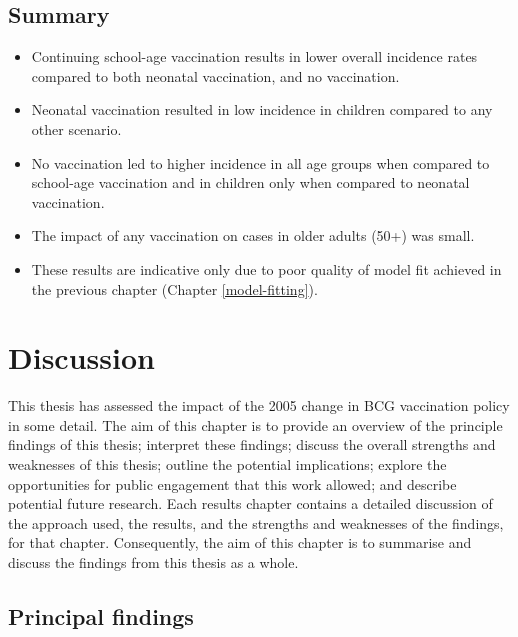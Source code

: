 \documentclass[11pt,twoside]{bristolthesis}
\providecommand{\tightlist}{%
  \setlength{\itemsep}{0pt}\setlength{\parskip}{0pt}}
\begin{document}
  \hypertarget{summary-9}{%
  \section{Summary}\label{summary-9}}
  \begin{itemize}
  \tightlist
  \item
    Continuing school-age vaccination results in lower overall incidence rates compared to both neonatal vaccination, and no vaccination.
  \item
    Neonatal vaccination resulted in low incidence in children compared to any other scenario.
  \item
    No vaccination led to higher incidence in all age groups when compared to school-age vaccination and in children only when compared to neonatal vaccination.
  \item
    The impact of any vaccination on cases in older adults (50+) was small.
  \item
    These results are indicative only due to poor quality of model fit achieved in the previous chapter (Chapter \ref{model-fitting}).
  \end{itemize}
  \hypertarget{discussion-chapt}{%
  \chapter{Discussion}\label{discussion-chapt}}
  
  This thesis has assessed the impact of the 2005 change in BCG vaccination policy in some detail. The aim of this chapter is to provide an overview of the principle findings of this thesis; interpret these findings; discuss the overall strengths and weaknesses of this thesis; outline the potential implications; explore the opportunities for public engagement that this work allowed; and describe potential future research. Each results chapter contains a detailed discussion of the approach used, the results, and the strengths and weaknesses of the findings, for that chapter. Consequently, the aim of this chapter is to summarise and discuss the findings from this thesis as a whole.
  
  \hypertarget{principal-findings}{%
  \section{Principal findings}\label{principal-findings}}
  
\end{document}
